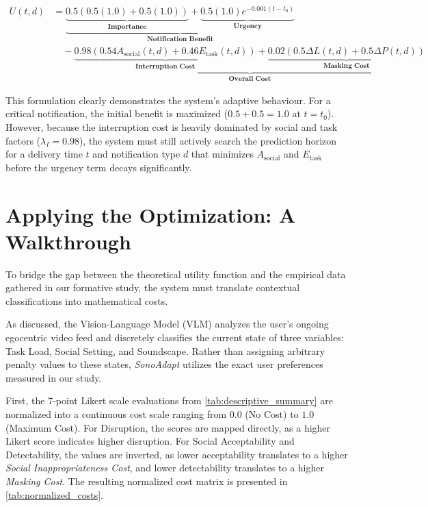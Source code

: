 \begin{equation}
\boxed{
\begin{aligned}
U(t,d) &= 
\underbrace{
  \underbrace{0.5 \left( 0.5(1.0) + 0.5(1.0) \right)}_{\textbf{Importance}}
  +
  \underbrace{0.5(1.0)e^{-0.001(t-t_0)}}_{\textbf{Urgency}}
}_{\textbf{Notification Benefit}} \\
&\quad - 
\underbrace{
  \underbrace{0.98 \left( 0.54A_{\mathrm{social}}(t,d) + 0.46E_{\mathrm{task}}(t,d) \right)}_{\textbf{Interruption Cost}}
  +
  \underbrace{0.02 \left( 0.5\Delta L(t,d) + 0.5\Delta P(t,d) \right)}_{\textbf{Masking Cost}}
}_{\textbf{Overall Cost}}
\end{aligned}
}
\label{eq:utility_example}
\end{equation}

This formulation clearly demonstrates the system's adaptive behaviour. For a critical notification, the initial benefit is maximized ($0.5 + 0.5 = 1.0$ at $t = t_0$). However, because the interruption cost is heavily dominated by social and task factors ($\lambda_I = 0.98$), the system must still actively search the prediction horizon for a delivery time $t$ and notification type $d$ that minimizes $A_{\mathrm{social}}$ and $E_{\mathrm{task}}$ before the urgency term decays significantly.




\section{Applying the Optimization: A Walkthrough}
\label{sec:optimization_walkthrough}

To bridge the gap between the theoretical utility function and the empirical data gathered in our formative study, the system must translate contextual classifications into mathematical costs. 

As discussed, the Vision-Language Model (VLM) analyzes the user's ongoing egocentric video feed and discretely classifies the current state of three variables: Task Load, Social Setting, and Soundscape. Rather than assigning arbitrary penalty values to these states, \textit{SonoAdapt} utilizes the exact user preferences measured in our study.

First, the 7-point Likert scale evaluations from \autoref{tab:descriptive_summary} are normalized into a continuous cost scale ranging from $0.0$ (No Cost) to $1.0$ (Maximum Cost). For Disruption, the scores are mapped directly, as a higher Likert score indicates higher disruption. For Social Acceptability and Detectability, the values are inverted, as lower acceptability translates to a higher \textit{Social Inappropriateness Cost}, and lower detectability translates to a higher \textit{Masking Cost}. The resulting normalized cost matrix is presented in \autoref{tab:normalized_costs}.

